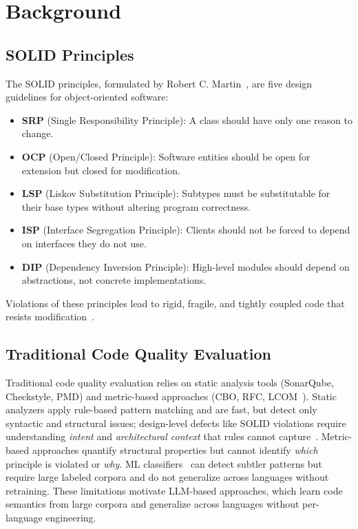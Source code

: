\documentclass[12pt,a4paper,oneside]{report}
\begin{document}
\chapter{Background}
\label{ch:background}

\section{SOLID Principles}

The SOLID principles, formulated by Robert C. Martin~\cite{Martin2000}, are five design guidelines for object-oriented software:

\begin{itemize}
  \item \textbf{SRP} (Single Responsibility Principle): A class should have only one reason to change.
  \item \textbf{OCP} (Open/Closed Principle): Software entities should be open for extension but closed for modification.
  \item \textbf{LSP} (Liskov Substitution Principle): Subtypes must be substitutable for their base types without altering program correctness.
  \item \textbf{ISP} (Interface Segregation Principle): Clients should not be forced to depend on interfaces they do not use.
  \item \textbf{DIP} (Dependency Inversion Principle): High-level modules should depend on abstractions, not concrete implementations.
\end{itemize}

Violations of these principles lead to rigid, fragile, and tightly coupled code that resists modification~\cite{Martin2017, AlOmar2023}.

\section{Traditional Code Quality Evaluation}

Traditional code quality evaluation relies on static analysis tools (SonarQube, Checkstyle, PMD) and metric-based approaches (CBO, RFC, LCOM~\cite{AlOmar2023}). Static analyzers apply rule-based pattern matching and are fast, but detect only syntactic and structural issues; design-level defects like SOLID violations require understanding \emph{intent} and \emph{architectural context} that rules cannot capture~\cite{Sharma2018}. Metric-based approaches quantify structural properties but cannot identify \emph{which} principle is violated or \emph{why}. ML classifiers~\cite{Palomba2015} can detect subtler patterns but require large labeled corpora and do not generalize across languages without retraining. These limitations motivate LLM-based approaches, which learn code semantics from large corpora and generalize across languages without per-language engineering.
\end{document}
